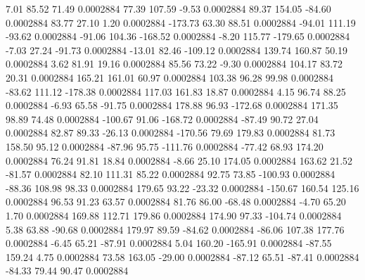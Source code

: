        7.01       85.52       71.49     0.0002884
       77.39      107.59       -9.53     0.0002884
       89.37      154.05      -84.60     0.0002884
       83.77       27.10        1.20     0.0002884
     -173.73       63.30       88.51     0.0002884
      -94.01      111.19      -93.62     0.0002884
      -91.06      104.36     -168.52     0.0002884
       -8.20      115.77     -179.65     0.0002884
       -7.03       27.24      -91.73     0.0002884
      -13.01       82.46     -109.12     0.0002884
      139.74      160.87       50.19     0.0002884
        3.62       81.91       19.16     0.0002884
       85.56       73.22       -9.30     0.0002884
      104.17       83.72       20.31     0.0002884
      165.21      161.01       60.97     0.0002884
      103.38       96.28       99.98     0.0002884
      -83.62      111.12     -178.38     0.0002884
      117.03      161.83       18.87     0.0002884
        4.15       96.74       88.25     0.0002884
       -6.93       65.58      -91.75     0.0002884
      178.88       96.93     -172.68     0.0002884
      171.35       98.89       74.48     0.0002884
     -100.67       91.06     -168.72     0.0002884
      -87.49       90.72       27.04     0.0002884
       82.87       89.33      -26.13     0.0002884
     -170.56       79.69      179.83     0.0002884
       81.73      158.50       95.12     0.0002884
      -87.96       95.75     -111.76     0.0002884
      -77.42       68.93      174.20     0.0002884
       76.24       91.81       18.84     0.0002884
       -8.66       25.10      174.05     0.0002884
      163.62       21.52      -81.57     0.0002884
       82.10      111.31       85.22     0.0002884
       92.75       73.85     -100.93     0.0002884
      -88.36      108.98       98.33     0.0002884
      179.65       93.22      -23.32     0.0002884
     -150.67      160.54      125.16     0.0002884
       96.53       91.23       63.57     0.0002884
       81.76       86.00      -68.48     0.0002884
       -4.70       65.20        1.70     0.0002884
      169.88      112.71      179.86     0.0002884
      174.90       97.33     -104.74     0.0002884
        5.38       63.88      -90.68     0.0002884
      179.97       89.59      -84.62     0.0002884
      -86.06      107.38      177.76     0.0002884
       -6.45       65.21      -87.91     0.0002884
        5.04      160.20     -165.91     0.0002884
      -87.55      159.24        4.75     0.0002884
       73.58      163.05      -29.00     0.0002884
      -87.12       65.51      -87.41     0.0002884
      -84.33       79.44       90.47     0.0002884
